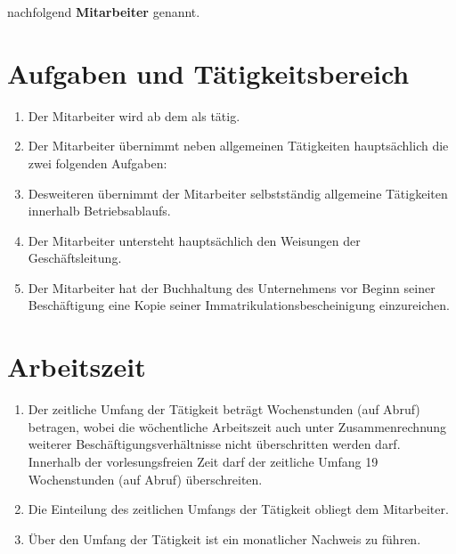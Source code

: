 \documentclass[twoside,a4paper]{scrreprt}
\begin{document}
    nachfolgend \textbf{Mitarbeiter} genannt.

\newpage
\section{Aufgaben und Tätigkeitsbereich}
    \centerline{\textbf{}}
    
    \centerline{ }
    \begin{enumerate}[label=(\alph*)]
    	\item Der Mitarbeiter wird ab dem \beginn \white als \stellenbezeichnung \white tätig.
    	\item Der Mitarbeiter übernimmt neben allgemeinen Tätigkeiten hauptsächlich die zwei folgenden Aufgaben:
    	\aufgabe
    	\item Desweiteren übernimmt der Mitarbeiter selbstständig allgemeine Tätigkeiten innerhalb Betriebsablaufs.
    	\item Der Mitarbeiter untersteht hauptsächlich den Weisungen der Geschäftsleitung.
    	\ifdefined\istStudent \item Der Mitarbeiter hat der Buchhaltung des Unternehmens vor Beginn seiner Beschäftigung eine Kopie seiner Immatrikulationsbescheinigung einzureichen.
    	\fi
    \end{enumerate}
    
\newpage      
\section{Arbeitszeit}
    
    \centerline{ }
    \begin{enumerate}[label=(\alph*)]
    	\ifdefined\stundenbasis\item Der zeitliche Umfang der Tätigkeit beträgt \stunden Wochenstunden (auf Abruf) betragen, wobei die wöchentliche Arbeitszeit auch unter Zusammenrechnung weiterer Beschäftigungsverhältnisse nicht überschritten werden darf. Innerhalb der vorlesungsfreien Zeit darf der zeitliche Umfang 19 Wochenstunden (auf Abruf) überschreiten.
    	\fi
    	\ifdefined\pauschal
    	\item Die Einteilung des zeitlichen Umfangs der Tätigkeit obliegt dem Mitarbeiter.
    	\fi
    	\item Über den Umfang der Tätigkeit ist ein monatlicher Nachweis zu führen.
    \end{enumerate}
\end{document}
